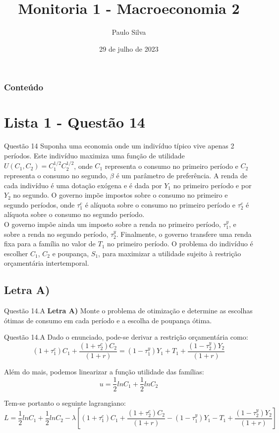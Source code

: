 \documentclass[aspectratio=169]{beamer}
\title[\textcolor{white}{Monitoria - Macro 2}]{Monitoria 1 - Macroeconomia 2}
\author[Silva]{Paulo Silva}
\institute[UFPE]{Universidade Federal de Pernambuco}
\date[\textcolor{white}{\today} ]
{29 de julho de 2023}
\begin{document}
\frame{\titlepage}
\begin{frame}
\frametitle{Conteúdo}
\tableofcontents
\end{frame}
\justifying
\section{Lista 1 - Questão 14}
\begin{frame}{Questão 14}
Suponha uma economia onde um indivíduo típico vive apenas 2 períodos. Este indivíduo maximiza uma função de utilidade $U(C_1, C_2) = C_1^{1/2}C_2^{1/2}$, onde $C_1$ representa o consumo no primeiro período e $C_2$ representa o consumo no segundo, $\beta$ é um parâmetro de preferência. A renda de cada indivíduo é uma dotação exógena e é dada por $Y_1$ no primeiro período e por $Y_2$ no segundo. O governo impõe impostos sobre o consumo no primeiro e segundo períodos, onde $\tau^c_1$ é alíquota sobre o consumo no primeiro período e $\tau^c_2$ é alíquota sobre o consumo no segundo período.\\
O governo impõe ainda um imposto sobre a renda no primeiro período, $\tau^y_1$, e sobre a renda no segundo período, $\tau^y_2$. Finalmente, o governo transfere uma renda fixa para a família no valor de $T_1$ no primeiro período. O problema do indivíduo é escolher $C_1$, $C_2$ e poupança, $S_1$, para maximizar a utilidade sujeito à restrição orçamentária intertemporal.
\end{frame}

\subsection{Letra A)}
\begin{frame}{Questão 14.A}
\textbf{Letra A)} Monte o problema de otimização e determine as escolhas ótimas de consumo em cada período
e a escolha de poupança ótima.
\end{frame}

\begin{frame}{Questão 14.A}
Dado o enunciado, pode-se derivar a restrição orçamentária como:
\begin{equation}\label{eq:14roi}
    (1+\tau_1^c)C_1 + \frac{(1+\tau_2^c)C_2}{(1+r)} = (1 -\tau_1^y)Y_1 + T_1 + \frac{(1 - \tau_2^y)Y_2}{(1+r)}
\end{equation}

Além do mais, podemos linearizar a função utilidade das famílias:
\begin{equation}
    u = \frac{1}{2}ln C_1 + \frac{1}{2}ln C_2
\end{equation}

Tem-se portanto o seguinte lagrangiano:
\begin{equation}
    L = \frac{1}{2}ln C_1 + \frac{1}{2}ln C_2 - \lambda \left[(1+\tau_1^c)C_1 + \frac{(1+\tau_2^c)C_2}{(1+r)} - (1-\tau_1^y)Y_1 - T_1 + \frac{(1-\tau_2^y)Y_2}{(1+r)} \right]
\end{equation}
\end{frame}
\end{document}
